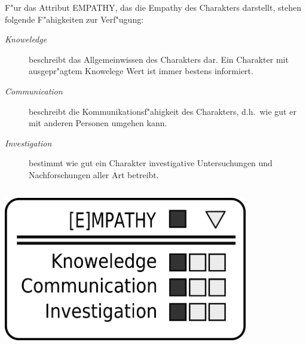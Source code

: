 \begin{column}[l]{0.55}
    F"ur das Attribut EMPATHY, das die Empathy des Charakters darstellt, stehen folgende F"ahigkeiten zur Verf"ugung:

    \begin{description}
        \item[\emph{Knoweledge}] beschreibt das Allgemeinwissen des Charakters dar. Ein Charakter mit ausgepr"agtem Knowelege Wert ist 
            immer bestens informiert.
        \item[\emph{Communication}] beschreibt die Kommunikationsf"ahigkeit des Charakters, d.h.~wie gut er mit anderen Personen umgehen 
            kann.
        \item[\emph{Investigation}] bestimmt wie gut ein Charakter investigative Untersuchungen und Nachforschungen aller Art betreibt.
    \end{description}
\end{column}
\begin{column}[r]{0.45}
    \centering
    \includegraphics[width=0.80\textwidth]{images/character_empathy.png}
\end{column}

